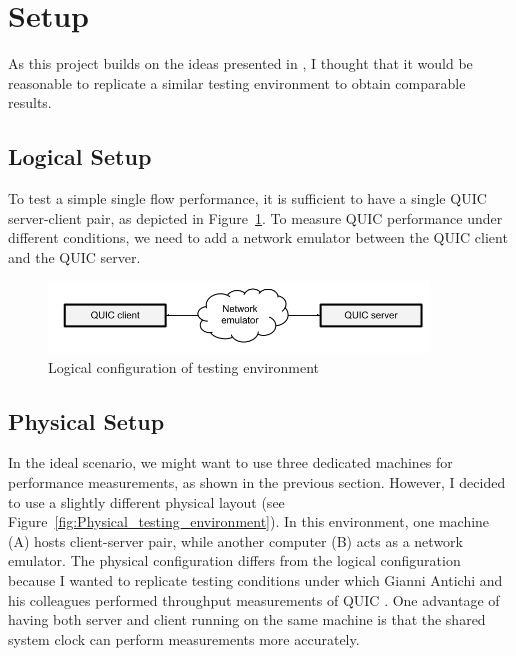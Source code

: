 \documentclass[12pt,a4paper,twoside,openright]{report}
\begin{document}




\section{Setup}

As this project builds on the ideas presented in \cite{Making_QUIC_Quicker}, I thought that it would be reasonable to replicate a similar testing environment to obtain comparable results.

\subsection{Logical Setup}
To test a simple single flow performance, it is sufficient to have a single QUIC server-client pair, as depicted in Figure~\ref{fig:Logical_testing_environment}.
To measure QUIC performance under different conditions, we need to add a network emulator between the QUIC client and the QUIC server.

    \begin{figure}[ht]
    \centering
    \includegraphics[width=0.9\textwidth]{figs/Logical_testing_environment.png}
    \caption{Logical configuration of testing environment}
    \label{fig:Logical_testing_environment}
    \end{figure}

\subsection{Physical Setup}
    In the ideal scenario, we might want to use three dedicated machines for performance measurements, as shown in the previous section.
    However, I decided to use a slightly different physical layout (see Figure~\ref{fig:Physical_testing_environment}).
    In this environment, one machine (A) hosts client-server pair, while another computer (B) acts as a network emulator.
    The physical configuration differs from the logical configuration because I wanted to replicate testing conditions under which Gianni Antichi and his colleagues performed throughput measurements of QUIC \cite{Making_QUIC_Quicker}.
    One advantage of having both server and client running on the same machine is that the shared system clock can perform measurements more accurately. 
    
\end{document}
